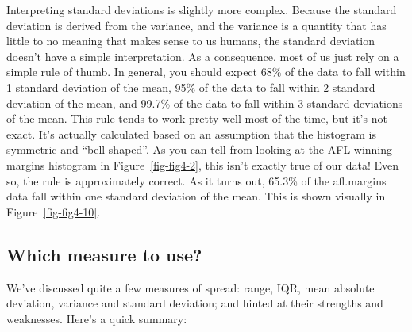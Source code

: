\documentclass[
  a4paper,
]{book}
\begin{document}
Interpreting standard deviations is slightly more complex. Because the
standard deviation is derived from the variance, and the variance is a
quantity that has little to no meaning that makes sense to us humans,
the standard deviation doesn't have a simple interpretation. As a
consequence, most of us just rely on a simple rule of thumb. In general,
you should expect 68\% of the data to fall within 1 standard deviation
of the mean, 95\% of the data to fall within 2 standard deviation of the
mean, and 99.7\% of the data to fall within 3 standard deviations of the
mean. This rule tends to work pretty well most of the time, but it's not
exact. It's actually calculated based on an assumption that the
histogram is symmetric and ``bell shaped''. As you can tell from looking
at the AFL winning margins histogram in Figure~\ref{fig-fig4-2}, this
isn't exactly true of our data! Even so, the rule is approximately
correct. As it turns out, 65.3\% of the afl.margins data fall within one
standard deviation of the mean. This is shown visually in
Figure~\ref{fig-fig4-10}.

\hypertarget{which-measure-to-use}{%
\subsection{Which measure to use?}\label{which-measure-to-use}}

We've discussed quite a few measures of spread: range, IQR, mean
absolute deviation, variance and standard deviation; and hinted at their
strengths and weaknesses. Here's a quick summary:
\end{document}
